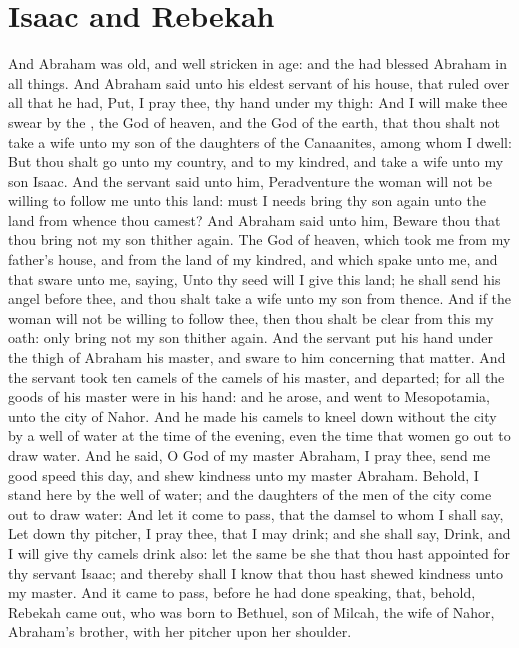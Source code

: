 \section*{Isaac and Rebekah}
\begin{biblechapter} %
\verse And Abraham was old, and well stricken in age: and the \LORD had blessed Abraham in all things.
\verse And Abraham said unto his eldest servant of his house, that ruled over all that he had, Put, I pray thee, thy hand under my thigh:
\verse And I will make thee swear by the \LORD, the God of heaven, and the God of the earth, that thou shalt not take a wife unto my son of the daughters of the Canaanites, among whom I dwell:
\verse But thou shalt go unto my country, and to my kindred, and take a wife unto my son Isaac.
\verse And the servant said unto him, Peradventure the woman will not be willing to follow me unto this land: must I needs bring thy son again unto the land from whence thou camest?
\verse And Abraham said unto him, Beware thou that thou bring not my son thither again.
\verse The \LORD God of heaven, which took me from my father's house, and from the land of my kindred, and which spake unto me, and that sware unto me, saying, Unto thy seed will I give this land; he shall send his angel before thee, and thou shalt take a wife unto my son from thence.
\verse And if the woman will not be willing to follow thee, then thou shalt be clear from this my oath: only bring not my son thither again.
\verse And the servant put his hand under the thigh of Abraham his master, and sware to him concerning that matter.
\verse And the servant took ten camels of the camels of his master, and departed; for all the goods of his master were in his hand: and he arose, and went to Mesopotamia, unto the city of Nahor.
\verse And he made his camels to kneel down without the city by a well of water at the time of the evening, even the time that women go out to draw water.
\verse And he said, O \LORD God of my master Abraham, I pray thee, send me good speed this day, and shew kindness unto my master Abraham.
\verse Behold, I stand here by the well of water; and the daughters of the men of the city come out to draw water:
\verse And let it come to pass, that the damsel to whom I shall say, Let down thy pitcher, I pray thee, that I may drink; and she shall say, Drink, and I will give thy camels drink also: let the same be she that thou hast appointed for thy servant Isaac; and thereby shall I know that thou hast shewed kindness unto my master.
\verse And it came to pass, before he had done speaking, that, behold, Rebekah came out, who was born to Bethuel, son of Milcah, the wife of Nahor, Abraham's brother, with her pitcher upon her shoulder.

\end{biblechapter}
